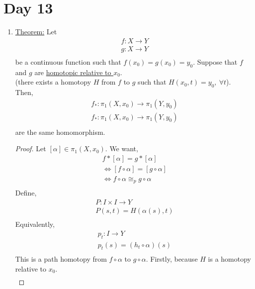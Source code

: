 \section{Day 13}
\begin{enumerate}
    \item \underline{Theorem:} 
        Let
        \begin{align*}
            f: X\rightarrow Y\\
            g: X\rightarrow Y\\
        \end{align*}
        be a continuous function such that $f(x_0)=g(x_0)=y_0$. Suppose that
        $f$ and $g$ are \underline{homotopic relative to $x_0$}.\\(there exists a homotopy
        $H$ from $f$ to $g$ such that $H(x_0, t)=y_0,\ \forall t$).\\
        Then,
        \begin{align*}
            f_*:\pi_1(X,x_0)\rightarrow \pi_1(Y,y_0)\\
            f_*:\pi_1(X,x_0)\rightarrow \pi_1(Y,y_0)\\
        \end{align*}
        are the same homomorphism.
        \begin{proof}
            Let $[\alpha]\in \pi_1(X,x_0)$. We want,
            \begin{align*}
                f*[\alpha]=g*[\alpha]\\
                \iff [f\circ \alpha]=[g\circ \alpha]\\
                \iff f\circ \alpha \cong_{p} g\circ\alpha\\
            \end{align*}
            Define,
            \begin{align*}
                P: I\times I \rightarrow Y\\
                P(s,t)=H(\alpha(s), t)\\
            \end{align*}
            Equivalently, 
            \begin{align*}
                p_t: I \rightarrow Y\\
                p_t(s)=(h_t\circ \alpha)(s)\\
            \end{align*}
            This is a path homotopy from $f\circ \alpha$ to $g\circ\alpha$.
            Firstly, because $H$ is a homotopy relative to $x_0$.
            \begin{align*}

\end{align*}
\end{proof}
\end{enumerate}
